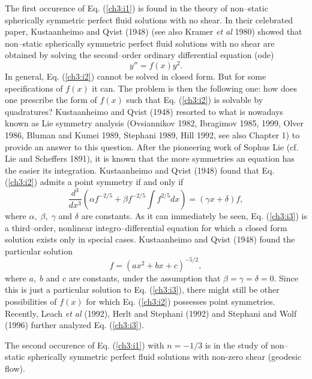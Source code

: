 The first occurence of Eq. (\ref{ch3:i1})  is found in the theory of non--static
spherically symmetric perfect fluid solutions with no shear. In their
celebrated paper, Kustaanheimo and Qvist (1948)
(see also Kramer {\em et al} 1980)  showed that
non--static spherically symmetric perfect fluid solutions with no shear
are obtained by solving the second--order ordinary differential equation
(ode) \begin{equation} y''=f(x)y^2. \label{ch3:i2} \end{equation} In general,
Eq. (\ref{ch3:i2}) cannot be solved in closed form. But for some
specifications of $f(x)$ it can. The problem is then the following one:
how does one prescribe the form of $f(x)$ such that Eq. (\ref{ch3:i2}) is
solvable by quadratures? Kustaanheimo and Qvist (1948) resorted to
what is nowadays known as Lie symmetry analysis
(Ovsiannikov 1982, Ibragimov 1985, 1999, Olver 1986, Bluman and Kumei 1989,
Stephani 1989, Hill 1992, see also Chapter 1)
to provide an answer to this question. After the pioneering work of Sophus
Lie (cf. Lie and Scheffers 1891), it is  known that the more symmetries an equation has the
easier its integration. Kustaanheimo and Qvist (1948) found that Eq. (\ref{ch3:i2})
admits a point symmetry if and only if 
\begin{equation} \frac{d^3}{dx^3}\left (
\alpha f^{-2/5}+\beta f^{-2/5}\int f^{2/5}dx \right ) =(\gamma x+\delta)f, 
\label{ch3:i3} \end{equation} 
where $\alpha,\;\beta,\; \gamma$ and
$\delta$ are constants. As it can immediately be seen, Eq. (\ref{ch3:i3}) is a
third--order, nonlinear integro--differential equation for which a
closed form solution exists only in special cases.
Kustaanheimo and Qvist (1948)
found the particular solution 
\begin{equation} f=(ax^2+bx+c)^{-5/2},
\end{equation} 
where $a,\;b$ and $c$ are constants, under the assumption that
$\beta=\gamma=\delta=0$. Since this is just a particular solution
to Eq. (\ref{ch3:i3}), there might still be other possibilities of $f(x)$ for which
Eq. (\ref{ch3:i2}) possesses point symmetries. Recently, Leach {\em et al}
(1992), Herlt and Stephani (1992) and  Stephani and Wolf (1996)
further analyzed  Eq.
(\ref{ch3:i3}). 

The second occurence of Eq. (\ref{ch3:i1}) with $n=-1/3$ is in the study of non--static spherically
symmetric perfect fluid solutions with non-zero shear (geodesic flow). 

